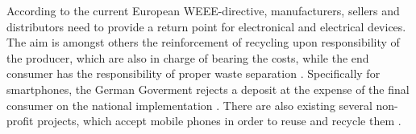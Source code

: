 According to the current European WEEE-directive, manufacturers, sellers and distributors need to 
provide a return point for electronical and electrical devices. The aim is amongst others the reinforcement 
of recycling upon responsibility of the producer, which are also in charge of bearing the costs, while the 
end consumer has the responsibility of proper waste separation \cite{EURLEX}. Specifically for smartphones, 
the German Goverment rejects a deposit at the expense of the final consumer on the national implementation \cite{BMUB}. 
There are also existing several non-profit projects, which accept mobile phones in order to reuse and recycle them \cite{NABU, DUH}.